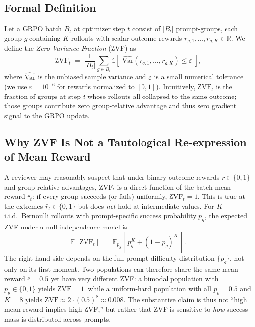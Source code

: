 \documentclass{article}
\begin{document}
\subsection{Formal Definition}

Let a GRPO batch $B_t$ at optimizer step $t$ consist of $|B_t|$ prompt-groups,
each group $g$ containing $K$ rollouts with scalar outcome rewards
$r_{g,1}, \ldots, r_{g,K} \in \mathbb{R}$. We define the \emph{Zero-Variance
Fraction} (ZVF) as
\begin{equation}
\label{eq:zvf}
\mathrm{ZVF}_t \;=\; \frac{1}{|B_t|} \sum_{g \in B_t}
  \mathbb{1}\!\left[\;\widehat{\mathrm{Var}}(r_{g,1}, \ldots, r_{g,K}) \le \varepsilon\;\right],
\end{equation}
where $\widehat{\mathrm{Var}}$ is the unbiased sample variance and
$\varepsilon$ is a small numerical tolerance
(we use $\varepsilon = 10^{-6}$ for rewards normalized to $[0,1]$).
Intuitively, $\mathrm{ZVF}_t$ is the fraction of groups at step $t$ whose
rollouts all collapsed to the same outcome; those groups contribute zero
group-relative advantage and thus zero gradient signal to the GRPO update.

\subsection{Why ZVF Is Not a Tautological Re-expression of Mean Reward}

A reviewer may reasonably suspect that under binary outcome rewards
$r \in \{0,1\}$ and group-relative advantages, $\mathrm{ZVF}_t$ is a direct
function of the batch mean reward $\bar{r}_t$: if every group succeeds
(or fails) uniformly, $\mathrm{ZVF}_t = 1$. This is true at the extremes
$\bar{r}_t \in \{0,1\}$ but does \emph{not} hold at intermediate values.
For $K$ i.i.d.~Bernoulli rollouts with prompt-specific success probability
$p_g$, the expected ZVF under a null independence model is
\begin{equation}
\mathbb{E}[\mathrm{ZVF}_t] \;=\; \mathbb{E}_{p_g}\!\left[\,p_g^{K} + (1-p_g)^{K}\,\right].
\end{equation}
The right-hand side depends on the full prompt-difficulty distribution
$\{p_g\}$, not only on its first moment. Two populations can therefore
share the same mean reward $\bar r = 0.5$ yet have very different ZVF:
a bimodal population with $p_g \in \{0,1\}$ yields $\mathrm{ZVF}=1$,
while a uniform-hard population with all $p_g = 0.5$ and $K=8$ yields
$\mathrm{ZVF} \approx 2 \cdot (0.5)^8 \approx 0.008$. The substantive
claim is thus not ``high mean reward implies high ZVF,'' but rather that
ZVF is sensitive to \emph{how} success mass is distributed across prompts.
\end{document}
